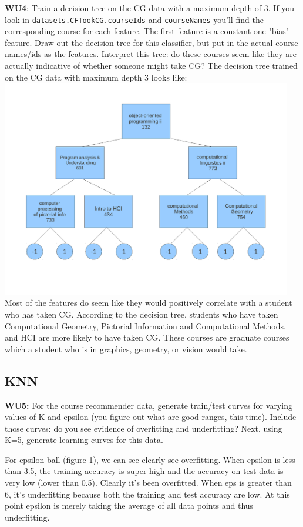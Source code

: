 \documentclass[a4paper,11pt]{article}
\begin{document}
\noindent
\textbf{WU4}: \textsf{Train a decision tree on the CG data with a maximum depth
of 3.  If you look in \texttt{datasets.CFTookCG.courseIds}
and \texttt{courseNames} you'll find the corresponding course for
each feature.  The first feature is a constant-one "bias" feature.
Draw out the decision tree for this classifier, but put in the actual
course names/ids as the features.  Interpret this tree: do these
courses seem like they are actually indicative of whether someone
might take CG?}
The decision tree trained on the CG data with maximum depth 3 looks
like:
\includegraphics[width=5in]{DTdrawing.pdf}
Most of the  features do seem like they would positively correlate
with a student who has taken CG. According to the decision tree,
students who have taken
Computational Geometry, Pictorial Information and Computational
Methods, and HCI are more likely to have taken CG. These courses are
graduate courses which a student who is in graphics, geometry, or
vision would take.

\subsection{KNN}
\textbf{WU5:} \textsf{For the course recommender data, generate train/test
curves for varying values of K and epsilon (you figure out what are
good ranges, this time).  Include those curves: do you see evidence of
overfitting and underfitting?  Next, using K=5, generate learning
curves for this data.}
 
For epsilon ball (figure 1),  we can see clearly see overfitting. When epsilon is
less than 3.5, the training accuracy is super high and the accuracy on
test data is very low (lower than 0.5). Clearly it's been
overfitted. When eps is greater than 6, it's underfitting because
both the training and test accuracy are low. At this point epsilon is
merely taking the average of all data points and thus underfitting. 
\end{document}
